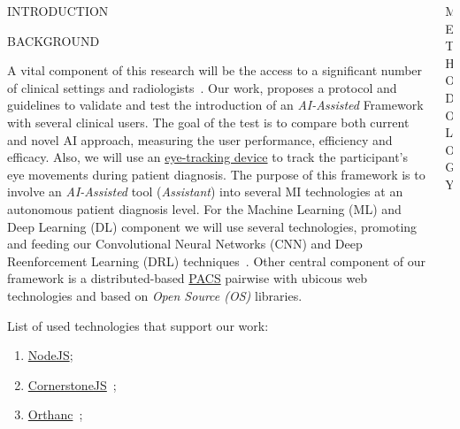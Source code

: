 \documentclass[final]{beamer}
\begin{document}
\begin{frame}[t, fragile = singleslide]{}
\begin{columns}[t]
\begin{column}{0.45\textwidth}
\begin{block}{INTRODUCTION}
\end{block}

\begin{block}{BACKGROUND}

A vital component of this research will be the access to a significant number of clinical settings and radiologists~\cite{calisto2017mimbcdui, https://doi.org/10.13140/rg.2.2.16566.14403/1}. Our work, proposes a protocol and guidelines to validate and test the introduction of an {\it AI-Assisted} Framework with several clinical users. The goal of the test is to compare both current and novel AI approach, measuring the user performance, efficiency and efficacy. Also, we will use an \hyperlink{https://gaming.tobii.com/products/}{eye-tracking device} to track the participant's eye movements during patient diagnosis. The purpose of this framework is to involve an \textit{AI-Assisted} tool (\textit{Assistant}) into several MI technologies at an autonomous patient diagnosis level. For the Machine Learning (ML) and Deep Learning (DL) component we will use several technologies, promoting and feeding our Convolutional Neural Networks (CNN) and Deep Reenforcement Learning (DRL) techniques~\cite{maicas2017deep}. Other central component of our framework is a distributed-based \hyperlink{https://www.sciencedirect.com/topics/medicine-and-dentistry/picture-archiving-and-communication-system}{PACS} pairwise with ubicous web technologies and based on \textit{Open Source (OS)} libraries.

\hfill

List of used technologies that support our work:

\begin{enumerate}
\item \hyperlink{https://nodejs.org}{NodeJS};
\item \hyperlink{https://cornerstonejs.org/}{CornerstoneJS}~\cite{hostetter2018integration};
\item \hyperlink{https://www.orthanc-server.com/}{Orthanc}~\cite{Jodogne:ISBI2013};
\end{enumerate}

\hfill

\end{block}

\end{column}

\begin{column}{0.45\textwidth}

\begin{block}{METHODOLOGY}


\end{block}
\end{column}
\end{columns}
\end{frame}
\end{document}
